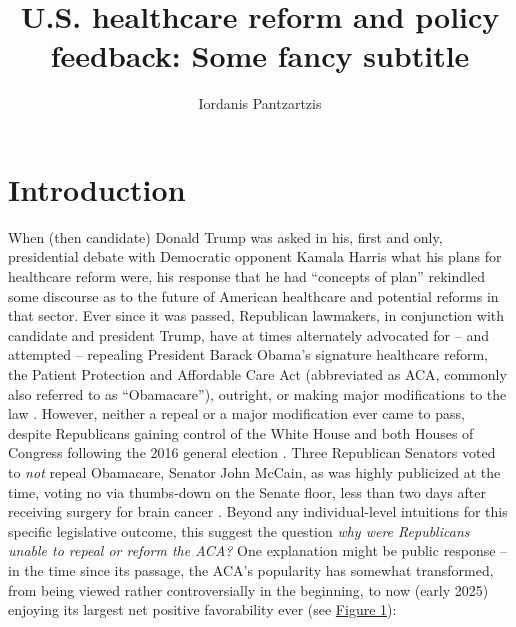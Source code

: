 \documentclass[11pt]{article}
\author[1]{Iordanis Pantzartzis}
\affil[1]{Universität Konstanz, 01/1001158}
\title{U.S. healthcare reform and policy feedback: Some fancy subtitle}
\begin{document}
% 


\maketitle

\section*{Introduction}

When (then candidate) Donald Trump was asked in his, first and only, presidential debate with Democratic opponent Kamala Harris what his plans for healthcare reform were, his response that he had \enquote{concepts of plan} \parencite[][]{Trump2024} rekindled some discourse as to the future of American healthcare and potential reforms in that sector. Ever since it was passed, Republican lawmakers, in conjunction with candidate and president Trump, have at times alternately advocated for -- and attempted -- repealing President Barack Obama's signature healthcare reform, the Patient Protection and Affordable Care Act (abbreviated as ACA, commonly also referred to as \enquote{Obamacare}), outright, or making major modifications to the law \parencite[][]{Armour2024}. However, neither a repeal or a major modification ever came to pass, despite Republicans gaining control of the White House and both Houses of Congress following the 2016 general election \parencite[][]{FEC2016}. Three Republican Senators voted to \textit{not} repeal Obamacare, Senator John McCain, as was highly publicized at the time, voting no via thumbs-down on the Senate floor, less than two days after receiving surgery for brain cancer \parencite[][]{Davis2016}. Beyond any individual-level intuitions for this specific legislative outcome, this suggest the question \textit{why were Republicans unable to repeal or reform the ACA?} One explanation might be public response -- in the time since its passage, the ACA's popularity has somewhat transformed, from being viewed rather controversially in the beginning, to now (early 2025) enjoying its largest net positive favorability ever (see \hyperref[fig:aca_fav]{Figure 1}):\\

\end{document}
